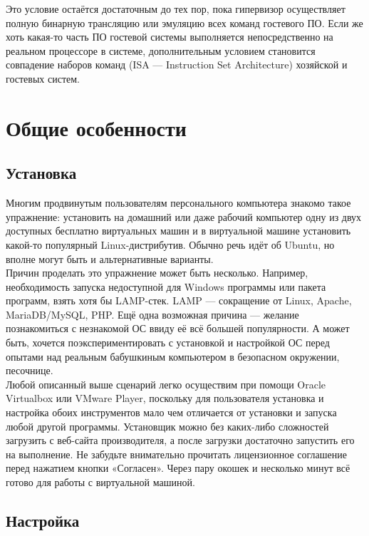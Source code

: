 \documentclass[14pt, a4paper]{article}
\begin{document}
Это условие остаётся достаточным до тех пор, пока гипервизор осуществляет полную бинарную
трансляцию или эмуляцию всех команд гостевого ПО. Если же хоть какая-то часть ПО гостевой
системы выполняется непосредственно на реальном процессоре в системе, дополнительным
условием становится совпадение наборов команд (ISA — Instruction Set Architecture) хозяйской и
гостевых систем.
\newpage


\section*{Общие особенности}

\subsection*{Установка}

Многим продвинутым пользователям персонального компьютера знакомо такое упражнение:
установить на домашний или даже рабочий компьютер одну из двух доступных бесплатно
виртуальных машин и в виртуальной машине установить какой-то популярный Linux-дистрибутив.
Обычно речь идёт об Ubuntu, но вполне могут быть и альтернативные варианты.\\

Причин проделать это упражнение может быть несколько. Например, необходимость запуска
недоступной для Windows программы или пакета программ, взять хотя бы LAMP-стек. LAMP —
сокращение от Linux, Apache, MariaDB/MySQL, PHP. Ещё одна возможная причина — желание
познакомиться с незнакомой ОС ввиду её всё большей популярности. А может быть, хочется
поэкспериментировать с установкой и настройкой ОС перед опытами над реальным бабушкиным
компьютером в безопасном окружении, песочнице.\\

Любой описанный выше сценарий легко осуществим при помощи Oracle Virtualbox или VMware Player,
поскольку для пользователя установка и настройка обоих инструментов мало чем отличается от
установки и запуска любой другой программы. Установщик можно без каких-либо сложностей
загрузить с веб-сайта производителя, а после загрузки достаточно запустить его на выполнение. Не
забудьте внимательно прочитать лицензионное соглашение перед нажатием кнопки «Согласен».
Через пару окошек и несколько минут всё готово для работы с виртуальной машиной.
\newpage

\subsection*{Настройка}
\end{document}
